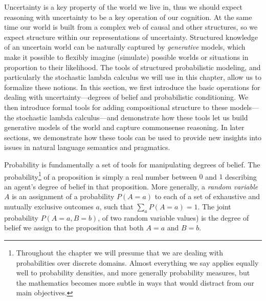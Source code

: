 \documentclass[pdfextras]{handbook}
\begin{document}
%  
  
 

Uncertainty is a key property of the world we live in, thus we should expect reasoning with uncertainty to be a key operation of our cognition. 
At the same time our world is built from a complex web of causal and other structures, so we expect structure within our representations of uncertainty. 
Structured knowledge of an uncertain world can be naturally captured by \emph{generative} models, which make it possible to flexibly imagine (simulate) possible worlds or situations in proportion to their likelihood. 
The tools of structured probabilistic modeling, and particularly the stochastic lambda calculus we will use in this chapter, allow us to formalize these notions. 
In this section, we first introduce the basic operations for dealing with uncertainty---degrees of belief and probabilistic conditioning. 
We then introduce formal tools for adding compositional structure to these models---the stochastic lambda calculus---and demonstrate how these tools let us build generative models of the world and capture commonsense reasoning. 
In later sections, we demonstrate how these tools can be used to provide new insights into issues in natural language semantics and pragmatics.

Probability is fundamentally a set of tools for manipulating degrees of belief. 
The probability\footnote{Throughout the chapter we will presume that we are dealing with probabilities over discrete domains. Almost everything we say  applies equally well to probability densities, and more generally probability measures, but the mathematics becomes more subtle in ways that would distract from our main objectives.} of a proposition is simply a real number between $0$ and $1$ describing an agent's degree of belief in that proposition. 
More generally, a \emph{random variable} $A$ is an assignment of a probability $P(A{=}a)$ to each of a set of exhaustive and mutually exclusive outcomes $a$, such that $\sum_a P(A{=}a)=1$. 
The joint probability $P(A{=}a,B{=}b)$, of two random variable values) is the degree of belief we assign to the proposition that both $A{=}a$ and $B{=}b$. 
\end{document}
